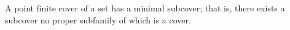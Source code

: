 A point finite cover of a set has a minimal subcover; that is, there exists a subcover no proper subfamily of which is a cover.
